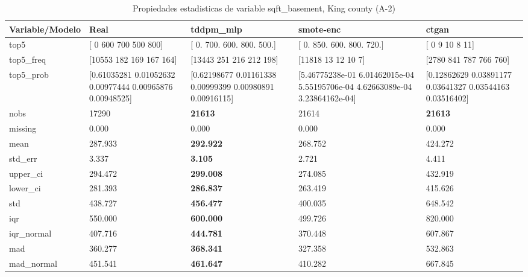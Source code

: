 \begin{table}[H]
\centering
\fontsize{8}{14}\selectfont
\caption{Propiedades  estadisticas de variable sqft\_basement, King county (A-2)}
\label{table-stats-king county-a-2-sqft_basement}
\begin{tabular}{|l|m{10em}|m{10em}|m{10em}|m{10em}|}
\hline
 \rowcolor[gray]{0.8}
Variable/Modelo & Real & tddpm\_mlp & smote-enc & ctgan \\
\hline top5 & [  0 600 700 500 800] & [  0. 700. 600. 800. 500.] & [  0. 850. 600. 800. 720.] & [ 0  9 10  8 11] \\
\hline top5\_freq & [10553   182   169   167   164] & [13443   251   216   212   198] & [11818    13    12    10     7] & [2780  841  787  766  760] \\
\hline top5\_prob & [0.61035281 0.01052632 0.00977444 0.00965876 0.00948525] & [0.62198677 0.01161338 0.00999399 0.00980891 0.00916115] & [5.46775238e-01 6.01462015e-04 5.55195706e-04 4.62663089e-04
 3.23864162e-04] & [0.12862629 0.03891177 0.03641327 0.03544163 0.03516402] \\
\hline nobs & 17290 & \bfseries 21613 & \cellcolor[rgb]{0.9, 0.54, 0.52} 21614 & \bfseries 21613 \\
\hline missing & 0.000 & 0.000 & 0.000 & 0.000 \\
\hline mean & 287.933 & \bfseries 292.922 & 268.752 & \cellcolor[rgb]{0.9, 0.54, 0.52} 424.272 \\
\hline std\_err & 3.337 & \bfseries 3.105 & 2.721 & \cellcolor[rgb]{0.9, 0.54, 0.52} 4.411 \\
\hline upper\_ci & 294.472 & \bfseries 299.008 & 274.085 & \cellcolor[rgb]{0.9, 0.54, 0.52} 432.919 \\
\hline lower\_ci & 281.393 & \bfseries 286.837 & 263.419 & \cellcolor[rgb]{0.9, 0.54, 0.52} 415.626 \\
\hline std & 438.727 & \bfseries 456.477 & 400.035 & \cellcolor[rgb]{0.9, 0.54, 0.52} 648.542 \\
\hline iqr & 550.000 & \bfseries 600.000 & 499.726 & \cellcolor[rgb]{0.9, 0.54, 0.52} 820.000 \\
\hline iqr\_normal & 407.716 & \bfseries 444.781 & 370.448 & \cellcolor[rgb]{0.9, 0.54, 0.52} 607.867 \\
\hline mad & 360.277 & \bfseries 368.341 & 327.358 & \cellcolor[rgb]{0.9, 0.54, 0.52} 532.863 \\
\hline mad\_normal & 451.541 & \bfseries 461.647 & 410.282 & \cellcolor[rgb]{0.9, 0.54, 0.52} 667.845 \\

\end{tabular}
\end{table}
